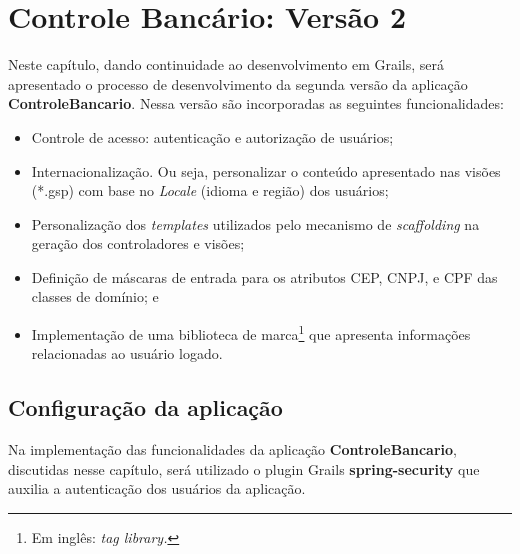 \chapter{Controle Bancário: Versão 2}\label{autenticacao}

Neste  capítulo,   dando  continuidade   ao  desenvolvimento  em   Grails,  será
apresentado o  processo de desenvolvimento  da segunda versão da  aplicação {\bf
  ControleBancario}. Nessa versão são incorporadas as seguintes funcionalidades:

\begin{itemize}

\vspace{0.5cm}

\item Controle de acesso: autenticação e autorização de usuários;

\vspace{0.5cm}

\item  Internacionalização. Ou  seja,  personalizar o  conteúdo apresentado  nas
  visões (*.gsp) com base no {\it Locale} (idioma e região) dos usuários;

\vspace{0.5cm}

\item  Personalização dos  {\it  templates} utilizados  pelo  mecanismo de  {\it
  scaffolding} na geração dos controladores e visões;

\vspace{0.5cm}

\item Definição  de máscaras de entrada para  os atributos CEP, CNPJ,  e CPF das
  classes de domínio; e 

\vspace{0.5cm}

\item  Implementação de  uma biblioteca  de marca\footnote{Em  inglês:  {\it tag
    library.}} que apresenta informações relacionadas ao usuário logado. 

\end{itemize}

\section{Configuração da aplicação} 

\vspace{0.5cm}

  Na implementação das funcionalidades
da aplicação {\bf ControleBancario}, discutidas nesse capítulo, será utilizado o
plugin Grails {\bf  spring-security} que auxilia a autenticação  dos usuários da
aplicação. 

